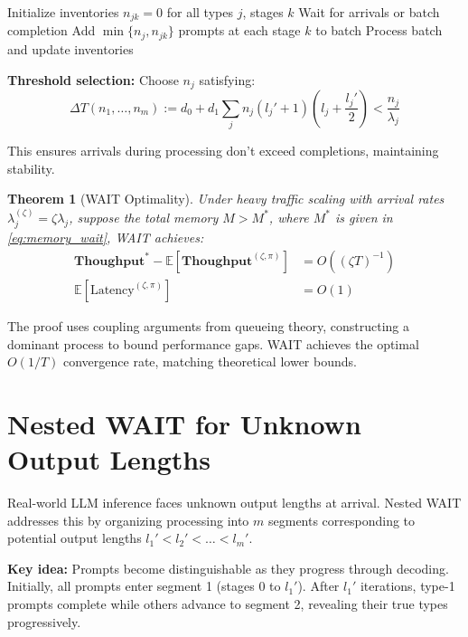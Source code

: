 \documentclass[preprint]{article}
\newcommand{\throughput}{\textbf{Thoughput}}
\theoremstyle{plain}
\newtheorem{theorem}{Theorem}[section]
\theoremstyle{definition}
\theoremstyle{remark}
\begin{document}
\begin{algorithm}[h]
\caption{WAIT Algorithm}
\begin{algorithmic}[1]\label{alg:wait}
\STATE Initialize inventories $n_{jk} = 0$ for all types $j$, stages $k$
    \STATE Wait for arrivals or batch completion
        \STATE Add $\min\{n_j, n_{jk}\}$ prompts at each stage $k$ to batch
    \ENDFOR
        \STATE Process batch and update inventories
    \ENDIF
\ENDWHILE
\end{algorithmic}
\end{algorithm}

\textbf{Threshold selection:} Choose $n_j$ satisfying:
\begin{equation}
\Delta T(n_1,\ldots,n_m) := d_0 + d_1\sum_j n_j(l_j'+1)(l_j+\frac{l_j'}{2}) < \frac{n_j}{\lambda_j}
\end{equation}

This ensures arrivals during processing don't exceed completions, maintaining stability.

\begin{theorem}[WAIT Optimality]\label{thm:wait_heavy_traffic}
Under heavy traffic scaling with arrival rates $\lambda_j^{(\zeta)} = \zeta\lambda_j$, suppose the total memory $M>M^*$, where $M^*$ is given in \eqref{eq:memory_wait}, WAIT achieves:
\begin{align}
\throughput^* - \mathbb{E}[\throughput^{(\zeta,\pi)}] &= O((\zeta T)^{-1}) \\
\mathbb{E}[\text{Latency}^{(\zeta,\pi)}] &= O(1)
\end{align}
\end{theorem}

The proof uses coupling arguments from queueing theory, constructing a dominant process to bound performance gaps. WAIT achieves the optimal $O(1/T)$ convergence rate, matching theoretical lower bounds.

\section{Nested WAIT for Unknown Output Lengths}

Real-world LLM inference faces unknown output lengths at arrival. Nested WAIT addresses this by organizing processing into $m$ segments corresponding to potential output lengths $l_1' < l_2' < \ldots < l_m'$.

\textbf{Key idea:} Prompts become distinguishable as they progress through decoding. Initially, all prompts enter segment 1 (stages 0 to $l_1'$). After $l_1'$ iterations, type-1 prompts complete while others advance to segment 2, revealing their true types progressively.
\end{document}

